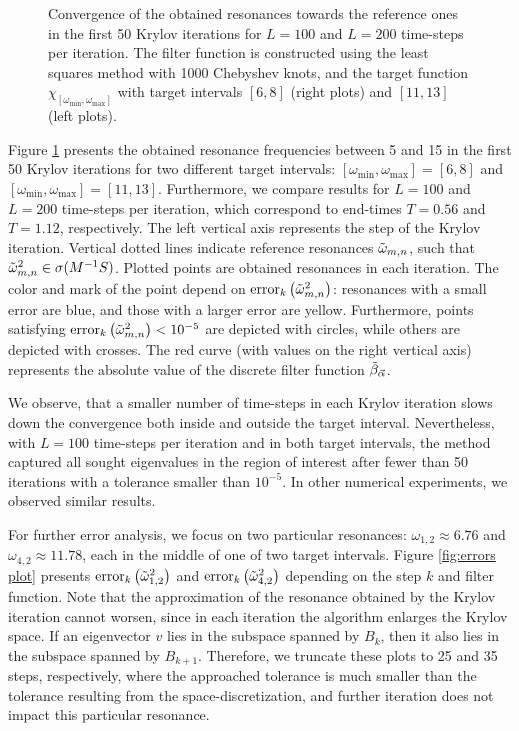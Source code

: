 \documentclass[a4paper,11pt,bibliography=totoc,listof=totoc,headinclude=true,cleardoublepage=empty,oneside]{scrbook}
\newcommand{\dffv}{\Tilde{\beta}_{\Vec{\alpha}}}
\begin{document}
\begin{figure}[p]
    \caption{Convergence of the obtained resonances towards the reference ones in the first 50 Krylov iterations for $L=100$ and $L=200$ time-steps per iteration. The filter function is constructed using the least squares method with 1000 Chebyshev knots, and the target function $\chi_{\left[\omega_{\min}, \omega_{\max}\right]}$ with target intervals $[6,8]$ (right plots) and $ [11,13]$ (left plots).} 
    \label{fig:simulation}
\end{figure}



Figure \ref{fig:simulation} presents the obtained resonance frequencies between 5 and 15 in the first 50 Krylov iterations for two different target intervals: $\left[\omega_{\min}, \omega_{\max}\right] = [6, 8]$ and $\left[\omega_{\min}, \omega_{\max}\right] = [11, 13]$. Furthermore, we compare results for $L=100$ and $L=200$ time-steps per iteration, which correspond to end-times $T=0.56$ and $T=1.12$, respectively. The left vertical axis represents the step of the Krylov iteration. Vertical dotted lines indicate reference resonances $\Tilde{\omega}_{m,n}$, such that $\Tilde{\omega}_{m,n}^2 \in \sigma(M^{-1}S)$. Plotted points are obtained resonances in each iteration. The color and mark of the point depend on $\mathrm{error}_{k}\left(\Tilde{\omega}_{m,n}^2\right)$: resonances with a small error are blue, and those with a larger error are yellow. Furthermore, points satisfying $\mathrm{error}_{k}\left(\Tilde{\omega}_{m,n}^2\right) < 10^{-5}$ are depicted with circles, while others are depicted with crosses. The red curve (with values on the right vertical axis) represents the absolute value of the discrete filter function $\dffv$. 

We observe, that a smaller number of time-steps in each Krylov iteration slows down the convergence both inside and outside the target interval. Nevertheless, with $L=100$ time-steps per iteration and in both target intervals, the method captured all sought eigenvalues in the region of interest after fewer than 50 iterations with a tolerance smaller than $10^{-5}$. In other numerical experiments, we observed similar results.

For further error analysis, we focus on two particular resonances: $\omega_{1,2} \approx 6.76$ and $\omega_{4,2} \approx 11.78$, each in the middle of one of two target intervals. Figure \ref{fig:errors plot} presents $\mathrm{error}_{k}\left(\Tilde{\omega}_{1,2}^2\right)$ and $\mathrm{error}_{k}\left(\Tilde{\omega}_{4,2}^2\right)$ depending on the step $k$ and filter function. Note that the approximation of the resonance obtained by the Krylov iteration cannot worsen, since in each iteration the algorithm enlarges the Krylov space. If an eigenvector $v$ lies in the subspace spanned by $B_k$, then it also lies in the subspace spanned by $B_{k+1}$. Therefore, we truncate these plots to 25 and 35 steps, respectively, where the approached tolerance is much smaller than the tolerance resulting from the space-discretization, and further iteration does not impact this particular resonance.
\end{document}
